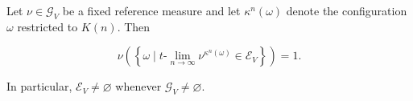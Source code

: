 Let $\nu \in \mathcal{G}_V$ be a fixed reference measure and let $\kappa^n(\omega)$ denote the configuration $\omega$ restricted to $K(n)$. Then

$$
\nu\left(\left\{ \omega \mid t\text{-}\lim_{n \to \infty} \nu^{\kappa^n(\omega)} \in \mathcal{E}_V \right\}\right) = 1.
$$

In particular, $\mathcal{E}_V \neq \varnothing$ whenever $\mathcal{G}_V \neq \varnothing$.
